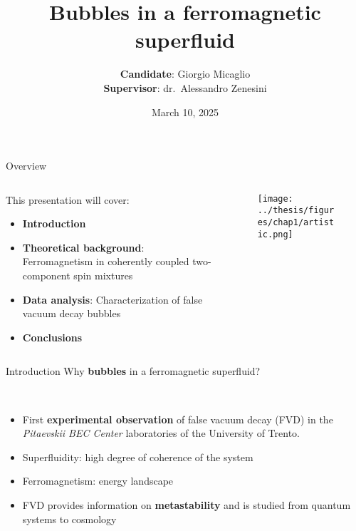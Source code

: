 \documentclass[aspectratio=169]{beamer}
\title[Bubbles in a ferromagnetic superfluid] %
{Bubbles in a ferromagnetic superfluid} %
\author{\textbf{Candidate}: Giorgio Micaglio\\\textbf{Supervisor}: dr.\ Alessandro Zenesini}
\institute{Bachelor's Degree in Physics}
\date[March 10, 2025]  %
{March 10, 2025} %
\begin{document}
\begin{frame}[plain]
  \titlepage
\end{frame}

\begin{frame}{Overview}
  \begin{columns}
      \begin{column}{0.7\textwidth}
          This presentation will cover:
          \begin{itemize}
              \item \textbf{Introduction}
              \item \textbf{Theoretical background}: Ferromagnetism in coherently coupled two-component spin mixtures
              \item \textbf{Data analysis}: Characterization of false vacuum decay bubbles
              \item \textbf{Conclusions}
          \end{itemize}
      \end{column}
      \begin{column}{0.3\textwidth}
          \begin{figure}
              \centering
              \texttt{[image: ../thesis/figures/chap1/artistic.png]}
          \end{figure}
      \end{column}
  \end{columns}
\end{frame}

\begin{frame}{Introduction}
  Why \textbf{bubbles} in a ferromagnetic superfluid?

  ~

  \begin{itemize}
      \item First \textbf{experimental observation} of false vacuum decay (FVD) in the \emph{Pitaevskii BEC Center} laboratories of the University of Trento.
      \item Superfluidity: high degree of coherence of the system
      \item Ferromagnetism: energy landscape
      \item FVD provides information on \textbf{metastability} and is studied from quantum systems to cosmology
  \end{itemize}
  
\end{frame}
\end{document}
